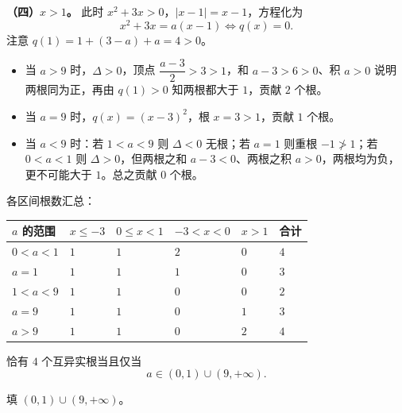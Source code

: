 \begin{answer}
\textbf{（四）$x>1$。} 此时 $x^2+3x>0$，$|x-1|=x-1$，方程化为
\nopagebreak[4]
\[x^2+3x=a(x-1)\iff q(x)=0.\]
注意 $q(1)=1+(3-a)+a=4>0$。

\begin{itemize}
\item 当 $a>9$ 时，$\Delta>0$，顶点 $\dfrac{a-3}{2}>3>1$，和 $a-3>6>0$、积 $a>0$ 说明两根同为正，再由 $q(1)>0$ 知两根都大于 $1$，贡献 $2$ 个根。
\item 当 $a=9$ 时，$q(x)=(x-3)^2$，根 $x=3>1$，贡献 $1$ 个根。
\item 当 $a<9$ 时：若 $1<a<9$ 则 $\Delta<0$ 无根；若 $a=1$ 则重根 $-1\not>1$；若 $0<a<1$ 则 $\Delta>0$，但两根之和 $a-3<0$、两根之积 $a>0$，两根均为负，更不可能大于 $1$。总之贡献 $0$ 个根。
\end{itemize}

各区间根数汇总：

\begin{center}
\begin{tabular}{llllll}
\toprule
$a$ 的范围 & $x\leqslant-3$ & $0\leqslant x<1$ & $-3<x<0$ & $x>1$ & 合计 \\
\midrule
$0<a<1$ & $1$ & $1$ & $2$ & $0$ & $4$ \\
$a=1$ & $1$ & $1$ & $1$ & $0$ & $3$ \\
$1<a<9$ & $1$ & $1$ & $0$ & $0$ & $2$ \\
$a=9$ & $1$ & $1$ & $0$ & $1$ & $3$ \\
$a>9$ & $1$ & $1$ & $0$ & $2$ & $4$ \\
\bottomrule
\end{tabular}
\end{center}

恰有 $4$ 个互异实根当且仅当
\nopagebreak[4]
\[a\in(0,1)\cup(9,+\infty).\]

填 $(0,1)\cup(9,+\infty)$。


\end{answer}

